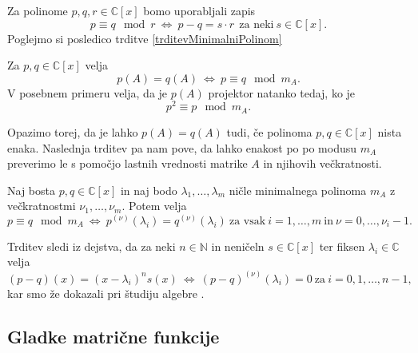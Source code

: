 \documentclass[mat1]{fmfdelo}
\newcommand{\N}{\mathbb N}
\newcommand{\C}{\mathbb C}
\begin{document}
Za polinome $p, q, r \in \C [x]$ bomo uporabljali zapis
\begin{equation*}
    p \equiv q \mod r\  \Longleftrightarrow\  p - q = s\cdot r\ \  \text{za neki}\  s\in \C [x].
\end{equation*}
Poglejmo si posledico trditve \ref{trditevMinimalniPolinom}
\begin{posledica} \label{posledicaProjekcija}
    Za $p, q \in \C [x]$ velja
    \begin{equation*}
        p(A) = q(A)\  \Longleftrightarrow\ p \equiv q \mod m_A.
    \end{equation*}
    V posebnem primeru velja, da je $p(A)$ projektor natanko tedaj, ko je
    \begin{equation*}
        p^2 \equiv p \mod m_A.
    \end{equation*}
\end{posledica}
Opazimo torej, da je lahko $p(A) = q(A)$ tudi, če polinoma $p, q \in \C [x]$ nista enaka. Naslednja trditev pa nam pove, da lahko enakost po po modusu $m_A$ preverimo le s pomočjo lastnih vrednosti matrike $A$ in njihovih večkratnosti.
\begin{trditev} \label{trditevPosploseniMinimalni}
    Naj bosta $p, q \in \C [x]$ in naj bodo $\lambda_1,\ldots,\lambda_m$ ničle minimalnega polinoma $m_A$ z večkratnostmi $\nu_1,\ldots,\nu_m$. Potem velja
    \begin{equation*}
        p \equiv q \mod m_A \ \Longleftrightarrow\  p^{\left(\nu\right)}\left(\lambda_i\right) = q^{\left(\nu\right)}\left(\lambda_i\right)\ \text{za vsak}\ i = 1, \ldots, m\ \text{in}\ \nu = 0, \ldots, \nu_i-1.
    \end{equation*}
\end{trditev}
\begin{dokaz}
    Trditev sledi iz dejstva, da za neki $n\in \N$ in neničeln $s \in \C [x]$ ter fiksen $\lambda_i \in \C$ velja
    \begin{equation*}
        \left(p-q\right)(x) = \left(x-\lambda_i\right)^n s(x) \ \Longleftrightarrow\  \left(p-q\right)^{(\nu)}(\lambda_i)=0 \ \text{za}\  i=0, 1, \ldots, n-1,
    \end{equation*}
    kar smo že dokazali pri študiju algebre \cite[poglavje 7.5]{bresar}.
\end{dokaz}

\subsection{Gladke matrične funkcije}
\end{document}
